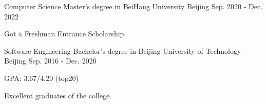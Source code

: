 \begin{cventries}
  \cventry
    {Computer Science}
    {Master's degree in BeiHang University}
    {Beijing}
    {Sep. 2020 - Dec. 2022}
    {\begin{cvitems}
    \item{Got a Freshman Entrance Scholarship.}
    \end{cvitems}
    }
    
    \cventry
    {Software Engineering}
    {Bachelor's degree in Beijing University of Technology}
    {Beijing}
    {Sep. 2016 - Dec. 2020}
    {\begin{cvitems}
    \item{GPA: 3.67/4.20 (top20)}
    \item{Excellent graduates of the college.}
    \end{cvitems}
    }
  
\end{cventries}
